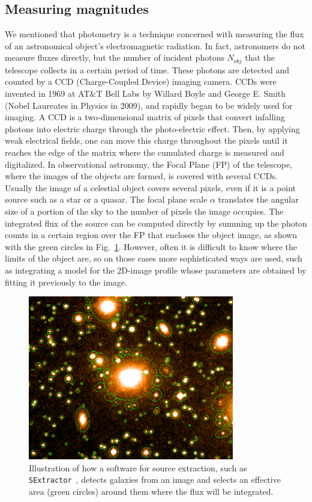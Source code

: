 \subsection{Measuring magnitudes}
\label{sec:measuring_mag}
We mentioned that photometry is a technique concerned with measuring the flux of an astronomical object's electromagnetic radiation. In fact, astronomers do not measure fluxes directly, but the number of incident photons $N_{obj}$ that the telescope collects in a certain period of time. These photons are detected and counted by a CCD (Charge-Coupled Device) imaging camera. CCDs were invented in 1969 at AT\&T Bell Labs by Willard Boyle and George E. Smith (Nobel Laureates in Physics in 2009), and rapidly began to be widely used for imaging. A CCD is a two-dimensional matrix of pixels that convert infalling photons into electric charge through the photo-electric effect. Then, by applying weak electrical fields, one can move this charge throughout the pixels until it reaches the edge of the matrix where the cumulated charge is measured and digitalized. In observational astronomy, the Focal Plane (FP) of the telescope, where the images of the objects are formed, is covered with several CCDs.  Usually the image of a celestial object covers several pixels, even if it is a point source such as a star or a quasar. The focal plane scale $\alpha$ translates the angular size of a portion of the sky to the number of pixels the image occupies. The integrated flux of the source can be computed directly by summing up the photon counts in a certain region over the FP that encloses the object image, as shown with the green circles in Fig.~\ref{fig:sextractor}. However, often it is difficult to know where the limits of the object are, so on those cases more sophisticated ways are used, such as integrating a model for the 2D-image profile whose parameters are obtained by fitting it previously to the image. 
\begin{figure}
\centering
\includegraphics[width=90mm]{./plots/sun226fig.png}
\caption{Illustration of how a software for source extraction, such as \texttt{SExtractor}~\citep{Bertin1996}, detects galaxies from an image and selects an effective area (green circles) around them where the flux will be integrated.}
\label{fig:sextractor}
\end{figure}
